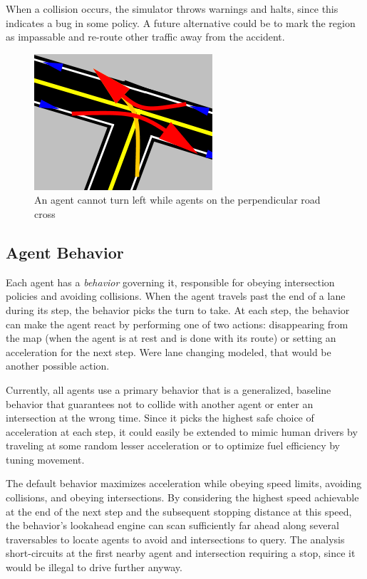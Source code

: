 \documentclass[letterpaper, 10 pt, conference]{ieeeconf}  %
\begin{document}
When a collision occurs, the simulator throws warnings and halts, since this
indicates a bug in some policy. A future alternative could be to mark the region
as impassable and re-route other traffic away from the accident.

\begin{figure}[h]
  \centering \includegraphics[scale=0.5]{turn_conflicts.png}
  \caption{An agent cannot turn left while agents on the perpendicular road cross}
  \label{fig:conflicts}
  \vspace{-15pt}
\end{figure}

\subsection{Agent Behavior}
\label{sec:behaviors}

Each agent has a \emph{behavior} governing it, responsible for obeying
intersection policies and avoiding collisions. When the agent travels past the
end of a lane during its step, the behavior picks the turn to take. At each
step, the behavior can make the agent react by performing one of two actions:
disappearing from the map (when the agent is at rest and is done with its route)
or setting an acceleration for the next step. Were lane changing modeled, that
would be another possible action. 

Currently, all agents use a primary behavior that is a generalized, baseline
behavior that guarantees not to collide with another agent or enter an
intersection at the wrong time. Since it picks the highest safe choice of
acceleration at each step, it could easily be extended to mimic human drivers by
traveling at some random lesser acceleration or to optimize fuel efficiency
by tuning movement.

The default behavior maximizes acceleration while obeying speed limits,
avoiding collisions, and obeying intersections. By considering the highest speed
achievable at the end of the next step and the subsequent stopping distance at
this speed, the behavior's lookahead engine can scan sufficiently far ahead
along several traversables to locate agents to avoid and intersections to query.
The analysis short-circuits at the first nearby agent and intersection requiring
a stop, since it would be illegal to drive further anyway.
\end{document}
